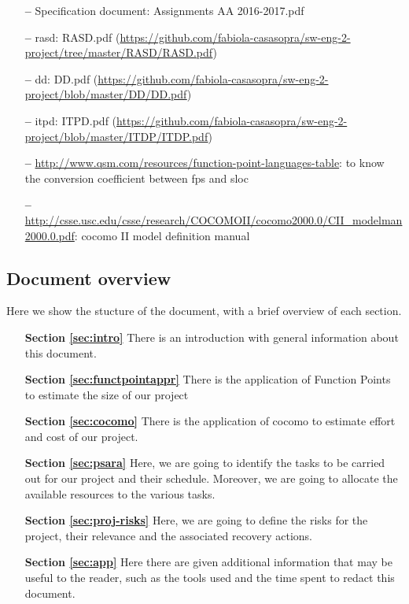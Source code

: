 \begin{itemize}
\item[\textbf{--}] Specification document: Assignments AA 2016-2017.pdf
\item[\textbf{--}] \acl{rasd}: RASD.pdf 
\newline
(\url{https://github.com/fabiola-casasopra/sw-eng-2-project/tree/master/RASD/RASD.pdf})
\item[\textbf{--}] \acl{dd}: DD.pdf 
\newline
(\url{https://github.com/fabiola-casasopra/sw-eng-2-project/blob/master/DD/DD.pdf})
\item[\textbf{--}] \acl{itpd}: ITPD.pdf 
\newline
(\url{https://github.com/fabiola-casasopra/sw-eng-2-project/blob/master/ITDP/ITDP.pdf})
\item[\textbf{--}] \url{http://www.qsm.com/resources/function-point-languages-table}: to know the conversion coefficient between \acs{fp}s and \acs{sloc}
\item[\textbf{--}] \url {http://csse.usc.edu/csse/research/COCOMOII/cocomo2000.0/CII_modelman2000.0.pdf}: \acs{cocomo} II model definition manual
\end{itemize}

\subsection{Document overview}

Here we show the stucture of the document, with a brief overview of each section.

\begin{itemize}

\item[\textbf{Section \ref{sec:intro}}]There is an introduction with general information about this document.

\item[\textbf{Section \ref{sec:functpointappr}}]There is the application of Function Points to estimate the size of our project  

\item[\textbf{Section \ref{sec:cocomo}}]There is the application of \acs{cocomo} to estimate effort and cost of our project.

\item[\textbf{Section \ref{sec:psara}}]Here, we are going to identify the tasks to be carried out for our project and their schedule. Moreover, we are going to allocate the available resources to the various tasks.

\item[\textbf{Section \ref{sec:proj-risks}}]Here, we are going to define the risks for the project, their relevance and the associated recovery actions.

\item[\textbf{Section \ref{sec:app}}]Here there are given additional information that may be useful to the reader, such as the tools used and the time spent to redact this document.
\end{itemize}